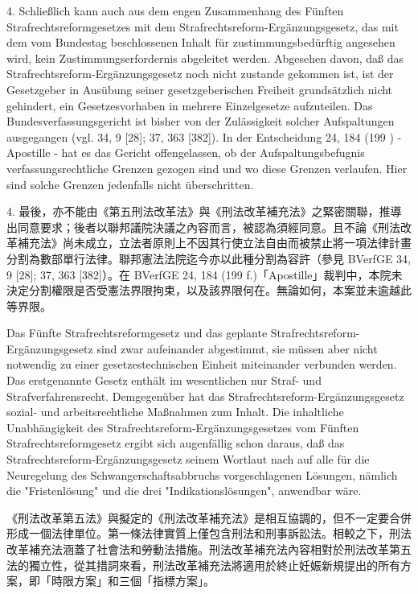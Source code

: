\documentclass[12pt]{article}
\begin{document}
\syncleft
\begin{sourcepara}
4. Schließlich kann auch aus dem engen Zusammenhang des Fünften Strafrechtsreformgesetzes mit dem Strafrechtsreform-Ergänzungsgesetz, das mit dem vom Bundestag beschlossenen Inhalt für zustimmungsbedürftig angesehen wird, kein Zustimmungserfordernis abgeleitet werden. Abgesehen davon, daß das Strafrechtsreform-Ergänzungsgesetz noch nicht zustande gekommen ist, ist der Gesetzgeber in Ausübung seiner gesetzgeberischen Freiheit grundsätzlich nicht gehindert, ein Gesetzesvorhaben in mehrere Einzelgesetze aufzuteilen. Das Bundesverfassungsgericht ist bisher von der Zulässigkeit solcher Aufspaltungen ausgegangen (vgl. \abbrBVerfGE{} 34, 9 [28]; 37, 363 [382]). In der Entscheidung \abbrBVerfGE{} 24, 184 (199 \abbrF{}) - Apostille - hat es das Gericht offengelassen, ob der Aufspaltungsbefugnis verfassungsrechtliche Grenzen gezogen sind und wo diese Grenzen verlaufen. Hier sind solche Grenzen jedenfalls nicht überschritten.
\end{sourcepara}
\begin{transpara}
4. 最後，亦不能由《第五刑法改革法》與《刑法改革補充法》之緊密關聯，推導出同意要求；後者以聯邦議院決議之內容而言，被認為須經同意。且不論《刑法改革補充法》尚未成立，立法者原則上不因其行使立法自由而被禁止將一項法律計畫分割為數部單行法律。聯邦憲法法院迄今亦以此種分割為容許（參見 BVerfGE 34, 9 [28]; 37, 363 [382]）。在 BVerfGE 24, 184 (199 f.)「Apostille」裁判中，本院未決定分割權限是否受憲法界限拘束，以及該界限何在。無論如何，本案並未逾越此等界限。
\end{transpara}

\syncleft
\begin{sourcepara}
Das Fünfte Strafrechtsreformgesetz und das geplante Strafrechtsreform-Ergänzungsgesetz sind zwar aufeinander abgestimmt, sie müssen aber nicht notwendig zu einer gesetzestechnischen Einheit miteinander verbunden werden. Das erstgenannte Gesetz enthält im wesentlichen nur Straf- und Strafverfahrensrecht. Demgegenüber hat das Strafrechtsreform-Ergänzungsgesetz sozial- und arbeitsrechtliche Maßnahmen zum Inhalt. Die inhaltliche Unabhängigkeit des Strafrechtsreform-Ergänzungsgesetzes vom Fünften Strafrechtsreformgesetz ergibt sich augenfällig schon daraus, daß das Strafrechtsreform-Ergänzungsgesetz seinem Wortlaut nach auf alle für die Neuregelung des Schwangerschaftsabbruchs vorgeschlagenen Lösungen, nämlich die "Fristenlösung" und die drei "Indikationslösungen", anwendbar wäre.
\end{sourcepara}
\begin{transpara}
《刑法改革第五法》與擬定的《刑法改革補充法》是相互協調的，但不一定要合併形成一個法律單位。第一條法律實質上僅包含刑法和刑事訴訟法。相較之下，刑法改革補充法涵蓋了社會法和勞動法措施。刑法改革補充法內容相對於刑法改革第五法的獨立性，從其措詞來看，刑法改革補充法將適用於終止妊娠新規提出的所有方案，即「時限方案」和三個「指標方案」。
\end{transpara}
\end{document}
